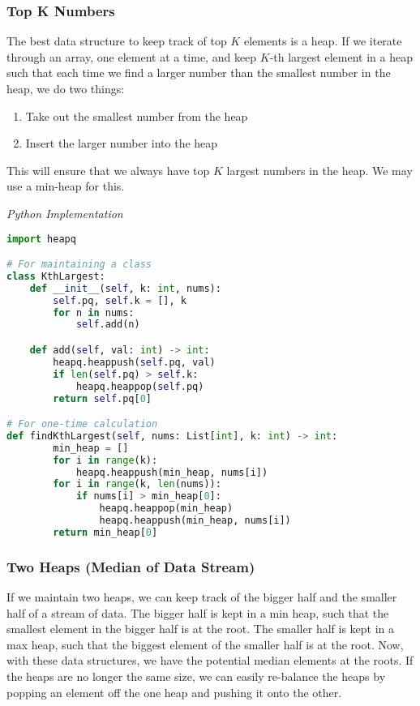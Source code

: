 \documentclass{article}
\begin{document}
    \subsubsection{Top K Numbers}
    The best data structure to keep track of top $K$ elements is a heap. If we iterate through an array, one element at a time, and keep $K$-th largest element in a heap such that each time we find a larger number than the smallest number in the heap, we do two things:
    \begin{enumerate}
        \item Take out the smallest number from the heap
        \item Insert the larger number into the heap
    \end{enumerate}
    This will ensure that we always have top $K$ largest numbers in the heap. We may use a min-heap for this.

\vspace{8pt} \emph{Python Implementation}
\begin{lstlisting}[language=Python]
import heapq

# For maintaining a class
class KthLargest:
    def __init__(self, k: int, nums):
        self.pq, self.k = [], k
        for n in nums:
            self.add(n)

    def add(self, val: int) -> int:
        heapq.heappush(self.pq, val)
        if len(self.pq) > self.k:
            heapq.heappop(self.pq)
        return self.pq[0]

# For one-time calculation
def findKthLargest(self, nums: List[int], k: int) -> int:
        min_heap = []
        for i in range(k):
            heapq.heappush(min_heap, nums[i])
        for i in range(k, len(nums)):
            if nums[i] > min_heap[0]:
                heapq.heappop(min_heap)
                heapq.heappush(min_heap, nums[i])
        return min_heap[0]
\end{lstlisting}

    
    \subsubsection{Two Heaps (Median of Data Stream)}
    If we maintain two heaps, we can keep track of the bigger half and the smaller half of a stream of data. The bigger half is kept in a min heap, such that the smallest element in the bigger half is at the root. The smaller half is kept in a max heap, such that the biggest element of the smaller half is at the root. Now, with these data structures, we have the potential median elements at the roots. If the heaps are no longer the same size, we can easily re-balance the heaps by popping an element off the one heap and pushing it onto the other.
\end{document}
